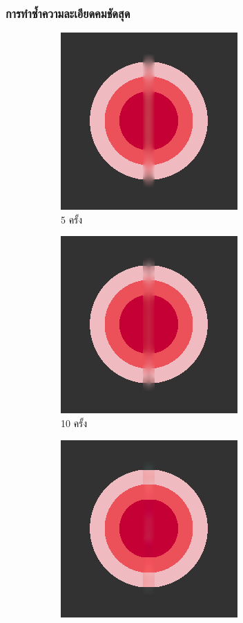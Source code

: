 \documentclass[xcolor=dvipsnames, xetex,serif]{beamer}
\numberwithin{equation}{section}
\begin{document}
		\begin{frame}
			\frametitle{การทำซ้ำความละเอียดคมชัดสุด}
			\begin{figure}[H]
				\centering
				\begin{subfigure}{0.4\linewidth}
					\centering
					\includegraphics[width=0.6\linewidth]{images/just10enough/only5time.png}
					\caption{5 ครั้ง}
				\end{subfigure}
				\begin{subfigure}{0.4\linewidth}
					\centering
					\includegraphics[width=0.6\linewidth]{images/just10enough/only10time.png}
					\caption{10 ครั้ง}
				\end{subfigure}
				\begin{subfigure}{0.4\linewidth}
					\centering
					\includegraphics[width=0.6\linewidth]{images/just10enough/only50time.png}			

\end{subfigure}
\end{figure}
\end{frame}
\end{document}
